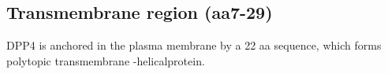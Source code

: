 \subsection{Transmembrane region (aa7-29)}

DPP4 is anchored in the plasma membrane by a 22 aa sequence, which forms polytopic transmembrane \alpha-helicalprotein. \cite{Hong_1990}